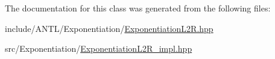 The documentation for this class was generated from the following files\-:\begin{DoxyCompactItemize}
\item 
include/\-A\-N\-T\-L/\-Exponentiation/\hyperlink{ExponentiationL2R_8hpp}{Exponentiation\-L2\-R.\-hpp}\item 
src/\-Exponentiation/\hyperlink{ExponentiationL2R__impl_8hpp}{Exponentiation\-L2\-R\-\_\-impl.\-hpp}\end{DoxyCompactItemize}
